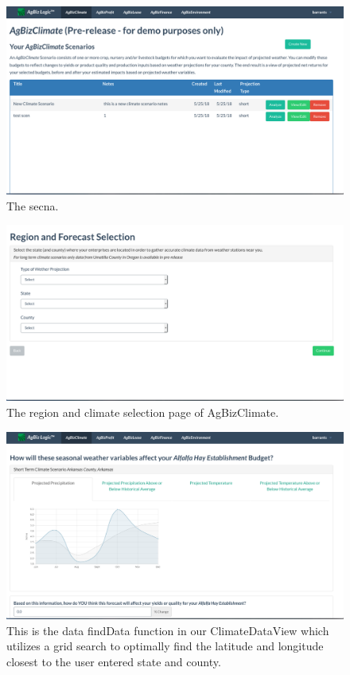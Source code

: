 \documentclass[onecolumn, draftclsnofoot,10pt, compsoc]{article}
\begin{document}
        \begin{figure}[h!]
            \includegraphics[width=18cm]{./Images/AgBizScenarios.png}
            \caption{The secna.}
        \end{figure}
    
        
        \begin{figure}[h!]
            \includegraphics[width=18cm]{./Images/RegionSelect.png}
            \caption{The region and climate selection page of AgBizClimate.}
        \end{figure}
            
        \begin{figure}[h!]
            \includegraphics[width=18cm]{./Images/ChartsPage.png}
            \caption{This is the data findData function in our ClimateDataView which utilizes a grid search to optimally find the latitude and longitude closest to the user entered state and county.}
        \end{figure}
        
\end{document}
